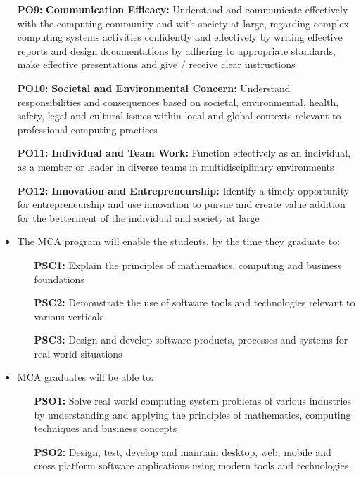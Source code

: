 \documentclass[12pt,a4paper]{article}
\begin{document}
\begin{itemize}
\begin{enumerate}[leftmargin=*,labelindent=05.7mm,labelsep=4mm]
\item[\textbf{PO9:}]\textbf{Communication Efficacy:} Understand and communicate effectively with the computing community and with society at large, regarding complex computing systems activities confidently and effectively by writing effective reports and design documentations by adhering to appropriate standards, make effective presentations and give / receive clear instructions \vspace{-0.1cm}
\item[\textbf{PO10:}]\textbf{Societal and Environmental Concern:} Understand responsibilities and consequences based on societal, environmental, health, safety, legal and cultural issues within local and global contexts relevant to professional computing practices \vspace{-0.1cm} 
\item[\textbf{PO11:}]\textbf{Individual and Team Work:} Function effectively as an individual, as a member or leader in diverse teams in multidisciplinary environments \vspace{-0.1cm} 
\item[\textbf{PO12:}]\textbf{Innovation and Entrepreneurship:} Identify a timely opportunity for entrepreneurship and use innovation to pursue and create value addition for the betterment of the individual and society at large
\end{enumerate}
\end{itemize}
\begin{itemize}
\item The MCA program will enable the students, by the time they graduate to:
\begin{enumerate}[leftmargin=*,labelindent=05.7mm,labelsep=4mm]
\item[\textbf{PSC1:}]Explain the principles of mathematics, computing and business foundations
\item[\textbf{PSC2:}]Demonstrate the use of software tools and technologies relevant to various verticals
\item[\textbf{PSC3:}]Design and develop software products, processes and systems for real world situations
\end{enumerate}
\end{itemize}
\thispagestyle{plain}
\begin{itemize}
\item MCA graduates will be able to:
\begin{enumerate}[leftmargin=*,labelindent=05.7mm,labelsep=4mm]
\item[\textbf{PSO1:}]Solve real world computing system problems of various industries by understanding and applying the principles of mathematics, computing techniques and business concepts \vspace{-0.3cm}
\item[\textbf{PSO2:}]Design, test, develop and maintain desktop, web, mobile and cross platform software applications using modern tools and technologies.
\end{enumerate}
\end{itemize}
\end{document}
